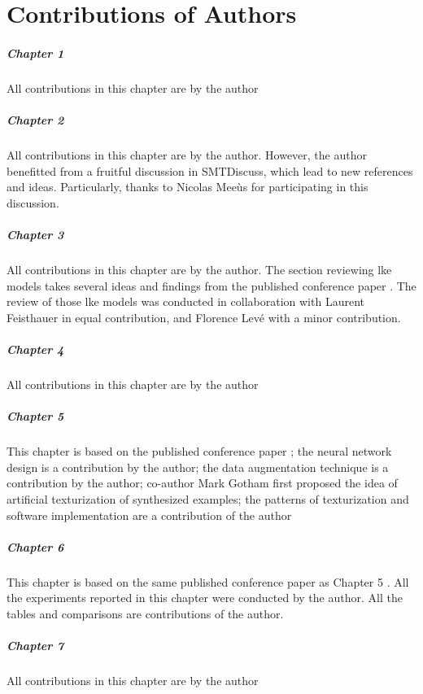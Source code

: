 \chapter*{Contributions of Authors}
\label{chap:contributionsofauthors}

\paragraph{Chapter 1}
All contributions in this chapter are by the author

\paragraph{Chapter 2}
All contributions in this chapter are by the author.
However, the author benefitted from a fruitful discussion in
SMTDiscuss,
which lead to new references and ideas. Particularly, thanks
to Nicolas Mee\`us for participating in this discussion.

\paragraph{Chapter 3} 
All contributions in this chapter are by the author. The
section reviewing \gls{lke} models takes several ideas and
findings from the published conference paper
\textcite{napoleslopez2020local}. The review of those
\gls{lke} models was conducted in collaboration with Laurent
Feisthauer in equal contribution, and Florence Lev\'e with a
minor contribution.

\paragraph{Chapter 4} 
All contributions in this chapter are by the author

\paragraph{Chapter 5}
This chapter is based on the published conference paper
\textcite{napoleslopez2021augmentednet}; the neural network
design is a contribution by the author; the data
augmentation technique is a contribution by the author;
co-author Mark Gotham first proposed the idea of artificial
texturization of synthesized examples; the patterns of
texturization and software implementation are a contribution
of the author

\paragraph{Chapter 6}
This chapter is based on the same published conference paper
as Chapter 5 \parencite{napoleslopez2021augmentednet}. All
the experiments reported in this chapter were conducted by
the author. All the tables and comparisons are contributions
of the author.

\paragraph{Chapter 7}
All contributions in this chapter are by the author
